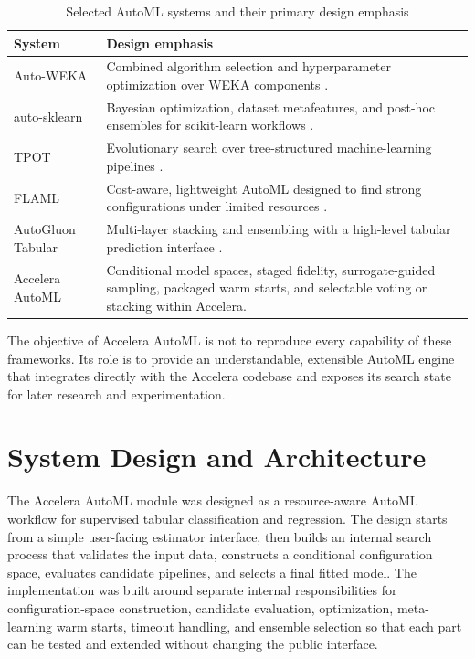 \documentclass[12pt,a4paper,oneside]{report}
\newcommand{\systemname}{Accelera AutoML}
\begin{document}
\begin{table}[H]
\centering
\caption{Selected AutoML systems and their primary design emphasis}
\label{tab:related-systems}

\renewcommand{\arraystretch}{1.15}
\begin{tabularx}{\textwidth}
{>{\raggedright\arraybackslash}p{}X}
\toprule
\textbf{System} & \textbf{Design emphasis} \\
\midrule

Auto-WEKA &
Combined algorithm selection and hyperparameter optimization over WEKA
components \cite{autoweka}. \\

auto-sklearn &
Bayesian optimization, dataset metafeatures, and post-hoc ensembles for
scikit-learn workflows \cite{autosklearn}. \\

TPOT &
Evolutionary search over tree-structured machine-learning pipelines
\cite{tpot}. \\

FLAML &
Cost-aware, lightweight AutoML designed to find strong configurations under
limited resources \cite{flaml}. \\

AutoGluon Tabular &
Multi-layer stacking and ensembling with a high-level tabular prediction
interface \cite{autogluon}. \\

\systemname{} &
Conditional model spaces, staged fidelity, surrogate-guided sampling,
packaged warm starts, and selectable voting or stacking within Accelera. \\

\bottomrule
\end{tabularx}
\end{table}

\noindent The objective of \systemname{} is not to reproduce every capability
of these frameworks. Its role is to provide an understandable, extensible
AutoML engine that integrates directly with the Accelera codebase and exposes
its search state for later research and experimentation.

\chapter{System Design and Architecture}
\label{chap:design}

The \systemname{} module was designed as a resource-aware AutoML workflow for
supervised tabular classification and regression. The design starts from a
simple user-facing estimator interface, then builds an internal search process
that validates the input data, constructs a conditional configuration space,
evaluates candidate pipelines, and selects a final fitted model. The
implementation was built around separate internal responsibilities for
configuration-space construction, candidate evaluation, optimization,
meta-learning warm starts, timeout handling, and ensemble selection so that each
part can be tested and extended without changing the public interface.
\end{document}
